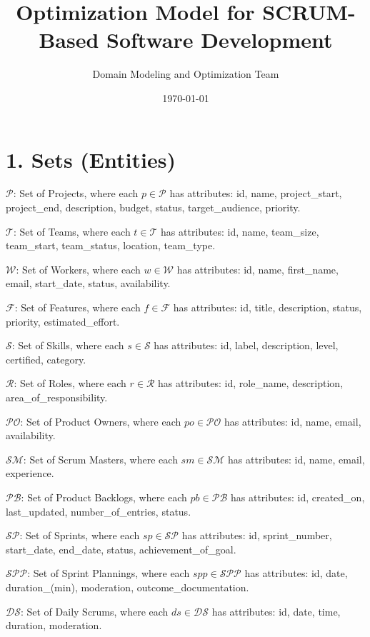 \documentclass[12pt]{article}
\title{Optimization Model for SCRUM-Based Software Development}
\author{Domain Modeling and Optimization Team}
\date{\today}
\begin{document}
\maketitle

\tableofcontents
\newpage

\section{1. Sets (Entities)}
\item $\mathcal{P}$: Set of Projects, where each $p \in \mathcal{P}$ has attributes: id, name, project\_start, project\_end, description, budget, status, target\_audience, priority.
    \item $\mathcal{T}$: Set of Teams, where each $t \in \mathcal{T}$ has attributes: id, name, team\_size, team\_start, team\_status, location, team\_type.
    \item $\mathcal{W}$: Set of Workers, where each $w \in \mathcal{W}$ has attributes: id, name, first\_name, email, start\_date, status, availability.
    \item $\mathcal{F}$: Set of Features, where each $f \in \mathcal{F}$ has attributes: id, title, description, status, priority, estimated\_effort.
    \item $\mathcal{S}$: Set of Skills, where each $s \in \mathcal{S}$ has attributes: id, label, description, level, certified, category.
    \item $\mathcal{R}$: Set of Roles, where each $r \in \mathcal{R}$ has attributes: id, role\_name, description, area\_of\_responsibility.
    \item $\mathcal{PO}$: Set of Product Owners, where each $po \in \mathcal{PO}$ has attributes: id, name, email, availability.
    \item $\mathcal{SM}$: Set of Scrum Masters, where each $sm \in \mathcal{SM}$ has attributes: id, name, email, experience.
    \item $\mathcal{PB}$: Set of Product Backlogs, where each $pb \in \mathcal{PB}$ has attributes: id, created\_on, last\_updated, number\_of\_entries, status.
    \item $\mathcal{SP}$: Set of Sprints, where each $sp \in \mathcal{SP}$ has attributes: id, sprint\_number, start\_date, end\_date, status, achievement\_of\_goal.
    \item $\mathcal{SPP}$: Set of Sprint Plannings, where each $spp \in \mathcal{SPP}$ has attributes: id, date, duration\_(min), moderation, outcome\_documentation.
    \item $\mathcal{DS}$: Set of Daily Scrums, where each $ds \in \mathcal{DS}$ has attributes: id, date, time, duration, moderation.
\end{document}
